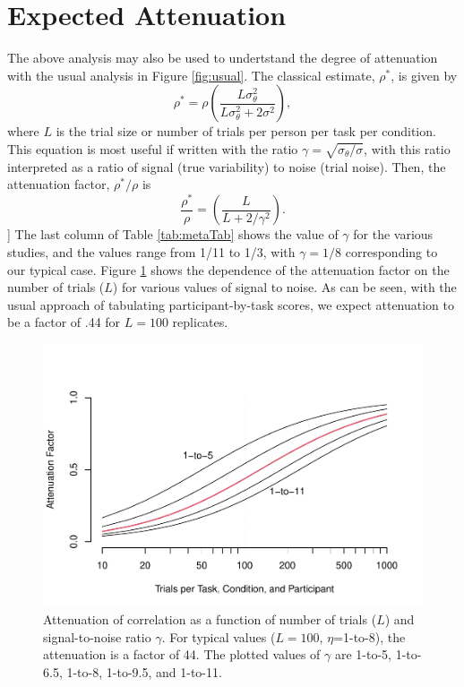 \documentclass[
  ,man]{apa6}
\begin{document}
\hypertarget{expected-attenuation}{%
\section{Expected Attenuation}\label{expected-attenuation}}

The above analysis may also be used to undertstand the degree of attenuation with the usual analysis in Figure \ref{fig:usual}. The classical estimate, \(\rho^*\), is given by
\[
\rho^* = \rho\left(\frac{L\sigma^2_\theta}{L\sigma^2_\theta+2\sigma^2}\right),
\]
where \(L\) is the trial size or number of trials per person per task per condition. This equation is most useful if written with the ratio \(\gamma=\sqrt{\sigma_\theta/ \sigma}\), with this ratio interpreted as a ratio of signal (true variability) to noise (trial noise). Then, the attenuation factor, \(\rho^*/\rho\) is
\begin{equation} \label{eq:fid}
\frac{\rho^*}{\rho} = \left( \frac{L}{L+2/\gamma^2}\right).
\end{equation}
{]}
The last column of Table \ref{tab:metaTab} shows the value of \(\gamma\) for the various studies, and the values range from 1/11 to 1/3, with \(\gamma=1/8\) corresponding to our typical case. Figure \ref{fig:attenuate} shows the dependence of the attenuation factor on the number of trials (\(L\)) for various values of signal to noise. As can be seen, with the usual approach of tabulating participant-by-task scores, we expect attenuation to be a factor of .44 for \(L=100\) replicates.

\begin{figure}
\centering
\includegraphics{p_files/figure-latex/attenuate-1.pdf}
\caption{\label{fig:attenuate}Attenuation of correlation as a function of number of trials (\(L\)) and signal-to-noise ratio \(\gamma\). For typical values (\(L=100\), \(\eta\)=1-to-8), the attenuation is a factor of 44. The plotted values of \(\gamma\) are 1-to-5, 1-to-6.5, 1-to-8, 1-to-9.5, and 1-to-11.}
\end{figure}
\end{document}
